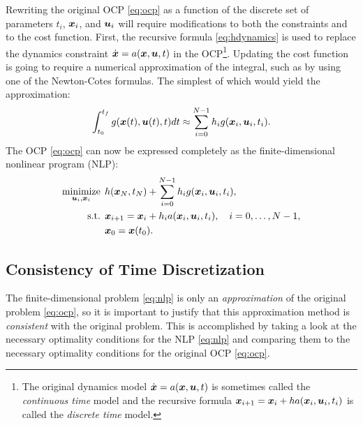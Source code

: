 Rewriting the original OCP \eqref{eq:ocp} as a function of the discrete set of parameters $t_i$, $\bm{x}_i$, and $\bm{u}_i$ will require modifications to both the constraints and to the cost function. First, the recursive formula \eqref{eq:hdynamics} is used to replace the dynamics constraint $\dot{\bm{x}} = a(\bm{x}, \bm{u}, t)$ in the OCP\footnote{The original dynamics model $\dot{\bm{x}} = a(\bm{x}, \bm{u}, t)$ is sometimes called the \textit{continuous time} model and the recursive formula $\bm{x}_{i+1} = \bm{x}_{i} + ha(\bm{x}_i, \bm{u}_i, t_i)$ is called the \textit{discrete time} model.}. Updating the cost function is going to require a numerical approximation of the integral, such as by using one of the Newton-Cotes formulas. The simplest of which would yield the approximation:
\begin{equation*}
\int_{t_0}^{t_f} g(\bm{x}(t),\bm{u}(t),t) dt \approx \sum_{i=0}^{N-1} h_i g(\bm{x}_i,\bm{u}_i,t_i).
\end{equation*}
The OCP \eqref{eq:ocp} can now be expressed completely as the finite-dimensional nonlinear program (NLP):
\begin{equation} \label{eq:nlp}
\begin{split}
\underset{\bm{u}_i,\bm{x}_i}{\text{minimize}} \:\: & h(\bm{x}_N,t_N) + \sum_{i=0}^{N-1} h_i g(\bm{x}_i,\bm{u}_i,t_i),\\
\text{s.t.} \:\:& \bm{x}_{i+1} = \bm{x}_{i} + h_ia(\bm{x}_i, \bm{u}_i, t_i), \quad i = 0, \dots, N-1, \\
&\bm{x}_0 = \bm{x}(t_0).
\end{split}
\end{equation}

\subsection{Consistency of Time Discretization}
The finite-dimensional problem \eqref{eq:nlp} is only an \textit{approximation} of the original problem \eqref{eq:ocp}, so it is important to justify that this approximation method is \textit{consistent} with the original problem. This is accomplished by taking a look at the necessary optimality conditions for the NLP \eqref{eq:nlp} and comparing them to the necessary optimality conditions for the original OCP \eqref{eq:ocp}.

